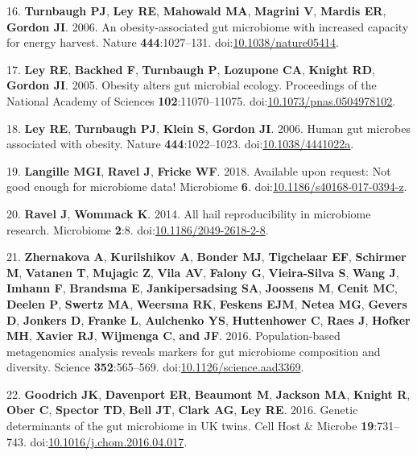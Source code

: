 \documentclass[]{article}
\begin{document}
\hypertarget{ref-Turnbaugh2006}{}
16. \textbf{Turnbaugh PJ}, \textbf{Ley RE}, \textbf{Mahowald MA},
\textbf{Magrini V}, \textbf{Mardis ER}, \textbf{Gordon JI}. 2006. An
obesity-associated gut microbiome with increased capacity for energy
harvest. Nature \textbf{444}:1027--131.
doi:\href{https://doi.org/10.1038/nature05414}{10.1038/nature05414}.

\hypertarget{ref-Ley2005}{}
17. \textbf{Ley RE}, \textbf{Backhed F}, \textbf{Turnbaugh P},
\textbf{Lozupone CA}, \textbf{Knight RD}, \textbf{Gordon JI}. 2005.
Obesity alters gut microbial ecology. Proceedings of the National
Academy of Sciences \textbf{102}:11070--11075.
doi:\href{https://doi.org/10.1073/pnas.0504978102}{10.1073/pnas.0504978102}.

\hypertarget{ref-Ley2006}{}
18. \textbf{Ley RE}, \textbf{Turnbaugh PJ}, \textbf{Klein S},
\textbf{Gordon JI}. 2006. Human gut microbes associated with obesity.
Nature \textbf{444}:1022--1023.
doi:\href{https://doi.org/10.1038/4441022a}{10.1038/4441022a}.

\hypertarget{ref-Langille2018}{}
19. \textbf{Langille MGI}, \textbf{Ravel J}, \textbf{Fricke WF}. 2018.
Available upon request: Not good enough for microbiome data! Microbiome
\textbf{6}.
doi:\href{https://doi.org/10.1186/s40168-017-0394-z}{10.1186/s40168-017-0394-z}.

\hypertarget{ref-Ravel2014}{}
20. \textbf{Ravel J}, \textbf{Wommack K}. 2014. All hail reproducibility
in microbiome research. Microbiome \textbf{2}:8.
doi:\href{https://doi.org/10.1186/2049-2618-2-8}{10.1186/2049-2618-2-8}.

\hypertarget{ref-Zhernakova2016}{}
21. \textbf{Zhernakova A}, \textbf{Kurilshikov A}, \textbf{Bonder MJ},
\textbf{Tigchelaar EF}, \textbf{Schirmer M}, \textbf{Vatanen T},
\textbf{Mujagic Z}, \textbf{Vila AV}, \textbf{Falony G},
\textbf{Vieira-Silva S}, \textbf{Wang J}, \textbf{Imhann F},
\textbf{Brandsma E}, \textbf{Jankipersadsing SA}, \textbf{Joossens M},
\textbf{Cenit MC}, \textbf{Deelen P}, \textbf{Swertz MA},
\textbf{Weersma RK}, \textbf{Feskens EJM}, \textbf{Netea MG},
\textbf{Gevers D}, \textbf{Jonkers D}, \textbf{Franke L},
\textbf{Aulchenko YS}, \textbf{Huttenhower C}, \textbf{Raes J},
\textbf{Hofker MH}, \textbf{Xavier RJ}, \textbf{Wijmenga C}, \textbf{and
JF}. 2016. Population-based metagenomics analysis reveals markers for
gut microbiome composition and diversity. Science \textbf{352}:565--569.
doi:\href{https://doi.org/10.1126/science.aad3369}{10.1126/science.aad3369}.

\hypertarget{ref-Goodrich2016}{}
22. \textbf{Goodrich JK}, \textbf{Davenport ER}, \textbf{Beaumont M},
\textbf{Jackson MA}, \textbf{Knight R}, \textbf{Ober C}, \textbf{Spector
TD}, \textbf{Bell JT}, \textbf{Clark AG}, \textbf{Ley RE}. 2016. Genetic
determinants of the gut microbiome in UK twins. Cell Host \& Microbe
\textbf{19}:731--743.
doi:\href{https://doi.org/10.1016/j.chom.2016.04.017}{10.1016/j.chom.2016.04.017}.
\end{document}

